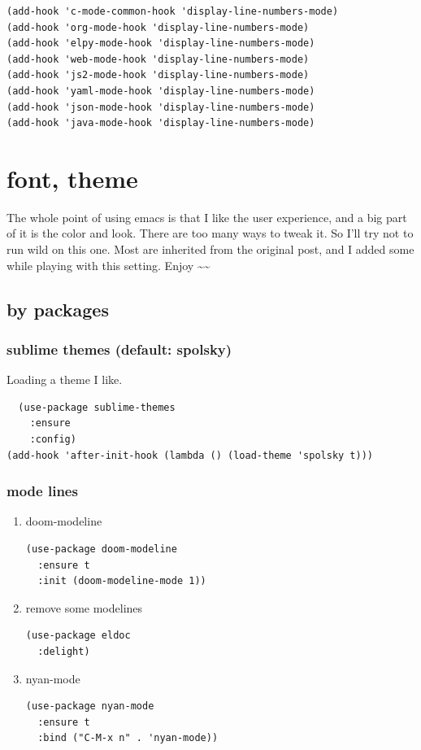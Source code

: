 \documentclass[11pt]{article}
\begin{document}
\begin{verbatim}
(add-hook 'c-mode-common-hook 'display-line-numbers-mode)
(add-hook 'org-mode-hook 'display-line-numbers-mode)
(add-hook 'elpy-mode-hook 'display-line-numbers-mode)
(add-hook 'web-mode-hook 'display-line-numbers-mode)
(add-hook 'js2-mode-hook 'display-line-numbers-mode)
(add-hook 'yaml-mode-hook 'display-line-numbers-mode)
(add-hook 'json-mode-hook 'display-line-numbers-mode)
(add-hook 'java-mode-hook 'display-line-numbers-mode)
\end{verbatim}

\section{font, theme}
\label{sec:orgef6d1b6}

The whole point of using emacs is that I like the user experience, and
a big part of it is the color and look. There are too many ways to
tweak it. So I'll try not to run wild on this one. Most are inherited
from the original post, and I added some while playing with this
setting. Enjoy \textasciitilde{}\textasciitilde{}

\subsection{by packages}
\label{sec:org6dc7d1f}

\subsubsection{sublime themes (default: spolsky)}
\label{sec:org26f6f09}

Loading a theme I like.

\begin{verbatim}
  (use-package sublime-themes
    :ensure
    :config)
(add-hook 'after-init-hook (lambda () (load-theme 'spolsky t)))
\end{verbatim}

\subsubsection{mode lines}
\label{sec:orgb0e7bed}
\begin{enumerate}
\item doom-modeline
\label{sec:orgd497039}
\begin{verbatim}
(use-package doom-modeline
  :ensure t
  :init (doom-modeline-mode 1))
\end{verbatim}
\item remove some modelines
\label{sec:org5a2394a}
\begin{verbatim}
(use-package eldoc
  :delight)
\end{verbatim}
\item nyan-mode
\label{sec:orgb018e9d}
\begin{verbatim}
(use-package nyan-mode
  :ensure t
  :bind ("C-M-x n" . 'nyan-mode))
\end{verbatim}
\end{enumerate}
\end{document}
